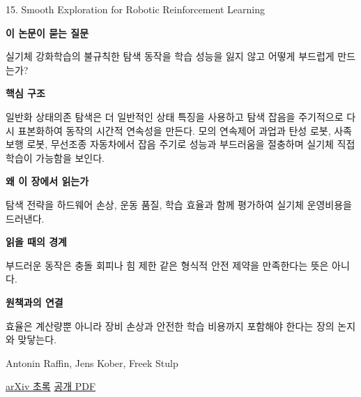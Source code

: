 \documentclass[11pt,openany]{book}
\begin{document}
\begin{termcard}{15. Smooth Exploration for Robotic Reinforcement Learning}

\par

\medskip

{\sffamily\bfseries\color{deepblue} 이 논문이 묻는 질문}\par

실기체 강화학습의 불규칙한 탐색 동작을 학습 성능을 잃지 않고 어떻게 부드럽게 만드는가?

\smallskip

{\sffamily\bfseries\color{deepblue} 핵심 구조}\par

일반화 상태의존 탐색은 더 일반적인 상태 특징을 사용하고 탐색 잡음을 주기적으로 다시 표본화하여 동작의 시간적 연속성을 만든다. 모의 연속제어 과업과 탄성 로봇, 사족보행 로봇, 무선조종 자동차에서 잡음 주기로 성능과 부드러움을 절충하며 실기체 직접 학습이 가능함을 보인다.

\smallskip

{\sffamily\bfseries\color{deepblue} 왜 이 장에서 읽는가}\par

탐색 전략을 하드웨어 손상, 운동 품질, 학습 효율과 함께 평가하여 실기체 운영비용을 드러낸다.

\smallskip

{\sffamily\bfseries\color{coral} 읽을 때의 경계}\par

부드러운 동작은 충돌 회피나 힘 제한 같은 형식적 안전 제약을 만족한다는 뜻은 아니다.

\smallskip

{\sffamily\bfseries\color{teal} 원책과의 연결}\par

효율은 계산량뿐 아니라 장비 손상과 안전한 학습 비용까지 포함해야 한다는 장의 논지와 맞닿는다.

\medskip

{\footnotesize\color{muted} Antonin Raffin, Jens Kober, Freek Stulp\par

\href{https://arxiv.org/abs/2005.05719}{arXiv 초록} \quad \href{https://arxiv.org/pdf/2005.05719}{공개 PDF}\par}

\end{termcard}
\end{document}

